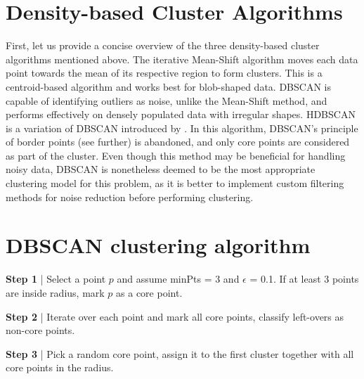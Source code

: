 \section{Density-based Cluster Algorithms}

First, let us provide a concise overview of the three density-based cluster algorithms mentioned above. The iterative Mean-Shift algorithm moves each data point towards the mean of its respective region to form clusters. This is a centroid-based algorithm and works best for blob-shaped data. DBSCAN is capable of identifying outliers as noise, unlike the Mean-Shift method, and performs effectively on densely populated data with irregular shapes. HDBSCAN is a variation of DBSCAN introduced by \textcite{campello_density-based_2013}. In this algorithm, DBSCAN's principle of border points (see further) is abandoned, and only core points are considered as part of the cluster. Even though this method may be beneficial for handling noisy data, DBSCAN is nonetheless deemed to be the most appropriate clustering model for this problem, as it is better to implement custom filtering methods for noise reduction before performing clustering.

\section{DBSCAN clustering algorithm}
\begin{marginfigure}
\vspace{0.5cm}
\centering

\vspace{0.1cm}
\caption{\textbf{Step 1} | Select a point $p$ and assume minPts = 3 and $\epsilon$ = 0.1. If at least 3 points are inside radius, mark $p$ as a core point.}
\label{dbscan1} 
\end{marginfigure}

\begin{marginfigure}
\centering

\vspace{0.1cm}
\caption{\textbf{Step 2} | Iterate over each point and mark all core points, classify left-overs as non-core points.}
\label{dbscan2} 
\end{marginfigure}

\begin{marginfigure}
\centering

\vspace{0.1cm}
\caption{\textbf{Step 3} | Pick a random core point, assign it to the first cluster together with all core points in the radius.}
\label{dbscan3} 
\end{marginfigure}

